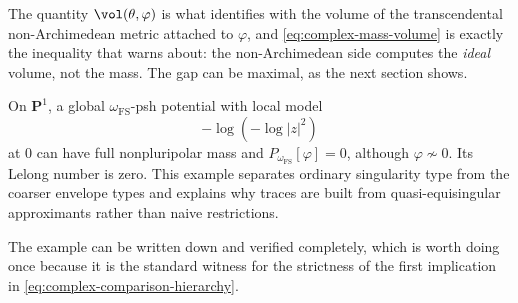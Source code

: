 The quantity \(\vol(\theta,\varphi)\) is what
 identifies with the volume of the
transcendental non-Archimedean metric attached to \(\varphi\), and
\eqref{eq:complex-mass-volume} is exactly the inequality that
 warns about: the non-Archimedean side
computes the \emph{ideal} volume, not the mass.  The gap can be
maximal, as the next section shows.

\begin{example}
\label{ex:complex-loglog-envelope}
On \(\mathbf P^1\), a global \(\omega_{\mathrm{FS}}\)-psh potential with
local model
\[
                        -\log(-\log|z|^2)
\]
at \(0\) can have full nonpluripolar mass and
\(P_{\omega_{\mathrm{FS}}}[\varphi]=0\), although
\(\varphi\not\sim0\).  Its Lelong number is zero.  This example separates
ordinary singularity type from the coarser envelope types and explains
why traces are built from quasi-equisingular approximants rather than
naive restrictions.
\end{example}

The example can be written down and verified completely, which is worth
doing once because it is the standard witness for the strictness of the
first implication in \eqref{eq:complex-comparison-hierarchy}.

